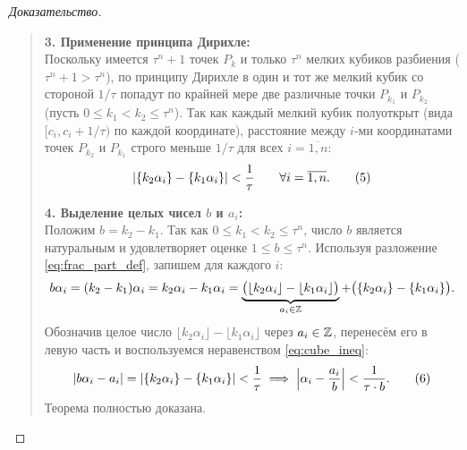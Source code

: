 \begin{proof}[Доказательство]
\begin{quote}
        \textbf{3. Применение принципа Дирихле:}\\
        Поскольку имеется $\tau^n + 1$ точек $P_k$ и только $\tau^n$ 
        мелких кубиков разбиения ($\tau^n + 1 > \tau^n$), по принципу 
        Дирихле в один и тот же мелкий кубик со стороной $1/\tau$ попадут 
        по крайней мере две различные точки $P_{k_1}$ и $P_{k_2}$ 
        (пусть $0 \le k_1 < k_2 \le \tau^n$). Так как каждый мелкий кубик 
        полуоткрыт (вида $[c_i, c_i + 1/\tau)$ по каждой координате), 
        расстояние между $i$-ми координатами точек $P_{k_2}$ и $P_{k_1}$ 
        строго меньше $1/\tau$ для всех $i = \overline{1, n}$:
        \begin{equation} \label{eq:cube_ineq}
            \left| \{k_2 \alpha_i\} - \{k_1 \alpha_i\} \right| < \frac{1}{\tau} \qquad 
            \forall i = \overline{1, n}. \tag{5}
        \end{equation}

        \textbf{4. Выделение целых чисел $b$ и $a_i$:}\\
        Положим $b = k_2 - k_1$. Так как $0 \le k_1 < k_2 \le \tau^n$, 
        число $b$ является натуральным и удовлетворяет оценке 
        $1 \le b \le \tau^n$. Используя разложение \eqref{eq:frac_part_def}, 
        запишем для каждого $i$:
        \[
            b \alpha_i = (k_2 - k_1) \alpha_i = k_2 \alpha_i - k_1 \alpha_i = 
            \underbrace{\bigl(\lfloor k_2 \alpha_i \rfloor - 
            \lfloor k_1 \alpha_i \rfloor\bigr)}_{a_i \in \mathbb{Z}} + 
            \bigl(\{k_2 \alpha_i\} - \{k_1 \alpha_i\}\bigr).
        \]
        Обозначив целое число $\lfloor k_2 \alpha_i \rfloor - 
        \lfloor k_1 \alpha_i \rfloor$ через $a_i \in \mathbb{Z}$, перенесём его в 
        левую часть и воспользуемся неравенством \eqref{eq:cube_ineq}:
        \begin{equation} \label{eq:dio_final}
            \left| b \alpha_i - a_i \right| = 
            \left| \{k_2 \alpha_i\} - \{k_1 \alpha_i\} \right| < \frac{1}{\tau} 
            \implies \left| \alpha_i - \frac{a_i}{b} \right| < \frac{1}{\tau \cdot b}. 
            \tag{6}
        \end{equation}
        Теорема полностью доказана.
    \end{quote}
\end{proof}

